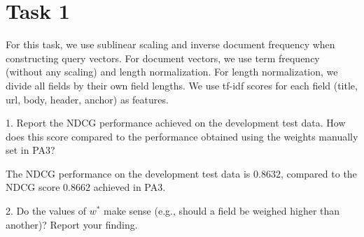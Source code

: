 
\usepackage{graphicx,amssymb,amsmath,enumerate}
\usepackage{courier}
\usepackage{color}
\usepackage{listings}
\usepackage{fancyvrb}
\usepackage{stmaryrd}

\oddsidemargin 0in
\evensidemargin 0in
\textwidth 6.5in
\topmargin -0.5in
\textheight 9.0in




\pagestyle{myheadings}  %

\section{Task 1}
For this task, we use sublinear scaling and inverse document frequency when constructing query vectors.
For document vectors, we use term frequency (without any scaling) and length normalization.
For length normalization, we divide all fields by their own field lengths.
We use tf-idf scores for each field (title, url, body, header, anchor) as features.

1. Report the NDCG performance achieved on the development test data. How does this score compared to the performance obtained using the weights manually set in PA3?

The NDCG performance on the development test data is $0.8632$, compared to the NDCG score $0.8662$ achieved in PA3.

2. Do the values of $w^*$ make sense (e.g., should a field be weighed higher than another)? Report your finding.

